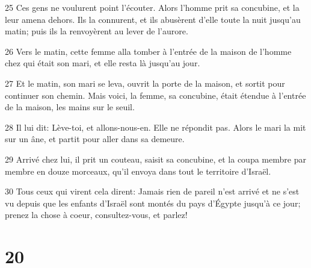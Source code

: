 \par 25 Ces gens ne voulurent point l'écouter. Alors l'homme prit sa concubine, et la leur amena dehors. Ils la connurent, et ils abusèrent d'elle toute la nuit jusqu'au matin; puis ils la renvoyèrent au lever de l'aurore.
\par 26 Vers le matin, cette femme alla tomber à l'entrée de la maison de l'homme chez qui était son mari, et elle resta là jusqu'au jour.
\par 27 Et le matin, son mari se leva, ouvrit la porte de la maison, et sortit pour continuer son chemin. Mais voici, la femme, sa concubine, était étendue à l'entrée de la maison, les mains sur le seuil.
\par 28 Il lui dit: Lève-toi, et allons-nous-en. Elle ne répondit pas. Alors le mari la mit sur un âne, et partit pour aller dans sa demeure.
\par 29 Arrivé chez lui, il prit un couteau, saisit sa concubine, et la coupa membre par membre en douze morceaux, qu'il envoya dans tout le territoire d'Israël.
\par 30 Tous ceux qui virent cela dirent: Jamais rien de pareil n'est arrivé et ne s'est vu depuis que les enfants d'Israël sont montés du pays d'Égypte jusqu'à ce jour; prenez la chose à coeur, consultez-vous, et parlez!

\chapter{20}

